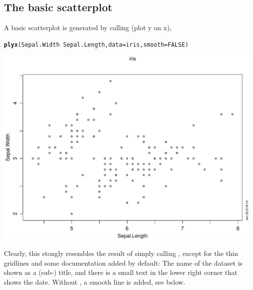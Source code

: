 \documentclass[11pt]{article}\usepackage[]{graphicx}\usepackage[]{color}
\makeatletter
\def\maxwidth{ %
  \ifdim\Gin@nat@width>\linewidth
    \linewidth
  \else
    \Gin@nat@width
  \fi
}
\newcommand{\hlnum}[1]{\textcolor[rgb]{0.686,0.059,0.569}{#1}}%
\newcommand{\hlopt}[1]{\textcolor[rgb]{0,0,0}{#1}}%
\newcommand{\hlstd}[1]{\textcolor[rgb]{0.345,0.345,0.345}{#1}}%
\newcommand{\hlkwc}[1]{\textcolor[rgb]{0.333,0.667,0.333}{#1}}%
\newcommand{\hlkwd}[1]{\textcolor[rgb]{0.737,0.353,0.396}{\textbf{#1}}}%
\newenvironment{kframe}{%
 \def\at@end@of@kframe{}%
 \ifinner\ifhmode%
  \def\at@end@of@kframe{\end{minipage}}%
  \begin{minipage}{\columnwidth}%
 \fi\fi%
 \def\FrameCommand##1{\hskip\@totalleftmargin \hskip-\fboxsep
 \colorbox{shadecolor}{##1}\hskip-\fboxsep
     \hskip-\linewidth \hskip-\@totalleftmargin \hskip\columnwidth}%
 \MakeFramed {\advance\hsize-\width
   \@totalleftmargin\z@ \linewidth\hsize
   \@setminipage}}%
 {\par\unskip\endMakeFramed%
 \at@end@of@kframe}
\newenvironment{knitrout}{}{} %
\makeatother
\begin{document}
\subsection{The basic scatterplot}
A basic scatterplot is generated by calling 
(plot y on x),
\begin{knitrout}
\color{fgcolor}\begin{kframe}
\begin{alltt}
\hlkwd{plyx}\hlstd{(Sepal.Width}\hlopt{~}\hlstd{Sepal.Length,} \hlkwc{data}\hlstd{=iris,} \hlkwc{smooth}\hlstd{=}\hlnum{FALSE}\hlstd{)}
\end{alltt}
\end{kframe}
\includegraphics[width=\maxwidth]{figure/plyx-1} 

\end{knitrout}
Clearly, this stongly resembles the result of simply calling , 
except for the thin gridlines and some documentation added by default: 
The name of the dataset is shown as a (sub-) title, and there is a small
text in the lower right corner that shows the date.
Without , a smooth line is added, see below.
\end{document}
